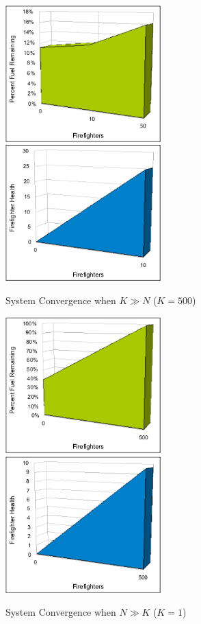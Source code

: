 \documentclass{article}
\begin{document}
\begin{description}
    \begin{figure}[htp]
      \centering
      \includegraphics[width=60mm]{images/k500.png}
      \includegraphics[width=60mm]{images/k500efficiency.png}
      \caption{System Convergence when $K \gg N$ ($K = 500$)}\label{fig:nltk}
    \end{figure}

    \begin{figure}[htp]
      \centering
      \includegraphics[width=60mm]{images/k1.png}
      \includegraphics[width=60mm]{images/k1efficiency.png}
      \caption{System Convergence when $N \gg K$ ($K = 1$)}\label{fig:ngtk}
    \end{figure}


\end{description}
\end{document}
